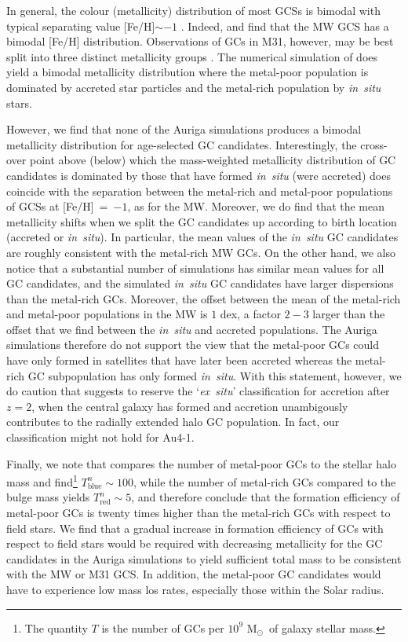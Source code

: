 \documentclass[a4paper,fleqn,usenatbib]{mnras}
\newcommand{\Sun}[0]{\ensuremath{_{\odot}}}
\begin{document}
In general, the colour (metallicity) distribution of most GCSs is bimodal 
with typical separating value [Fe/H]$\sim -1$ \citep{1985ApJ...293..424Z,
1999AJ....118.1526G,2001AJ....121.2974L,2006ApJ...639...95P}. Indeed, 
\citet{1998gcs..book.....A} and \citet{Harris2001} find that the MW GCS has a 
bimodal [Fe/H] distribution. Observations of GCs in M31, however, may be best 
split into three distinct metallicity groups \citep{2016ApJ...824...42C}. The 
numerical simulation of \citet{2017MNRAS.465.3622R} does yield a bimodal 
metallicity distribution where the metal-poor population is dominated by accreted 
star particles and the metal-rich population by {\it in~situ} stars. 

However, we find that none of the Auriga simulations produces a bimodal 
metallicity distribution for age-selected GC candidates. Interestingly, the 
cross-over point above (below) which the mass-weighted metallicity distribution
of GC candidates is dominated by those that have formed {\it in~situ} (were
accreted) does coincide with the separation between the metal-rich and metal-poor
populations of GCSs at [Fe/H]~=~$-1$, as for the MW. Moreover, we do find 
that the mean metallicity shifts when we split the GC candidates up according 
to birth location (accreted or {\it in~situ}). In particular, the mean values of 
the {\it in~situ} GC candidates are roughly consistent with the metal-rich MW GCs.
On the other hand, we also notice that a substantial number of simulations has similar 
mean values for all GC candidates, and the simulated {\it in~situ} GC candidates 
have larger dispersions than the metal-rich GCs. Moreover, the offset between 
the mean of the metal-rich and metal-poor populations in the MW is $1$ dex, a
factor $2-3$ larger than the offset that we find between the {\it in~situ} and 
accreted populations. The Auriga simulations therefore do not support the view 
that the metal-poor GCs could have only formed in satellites that have later been 
accreted whereas the metal-rich GC subpopulation has only formed {\it in~situ}. 
With this statement, however, we do caution that \citet{2019MNRAS.486.3134K} suggests 
to reserve the `{\it ex~situ}' classification for accretion after $z=2$, when
the central galaxy has formed and accretion unambigously contributes to the
radially extended halo GC population. In fact, our classification might not hold
for Au4-1.

Finally, we note that \citet{2006ARA&A..44..193B} compares the number of metal-poor 
GCs to the stellar halo mass and find\footnote{The quantity $T$ is the number of 
GCs per $10^9$ M\Sun \, of galaxy stellar mass.} $T^n_{\text{blue}} \sim 100$, 
while the number of metal-rich GCs compared to the bulge mass yields 
$T^n_{\text{red}} \sim 5$, and therefore conclude that the formation efficiency
of metal-poor GCs is twenty times higher than the metal-rich GCs with respect to 
field stars. We find that a gradual increase in formation efficiency of GCs
with respect to field stars would be required with decreasing metallicity for
the GC candidates in the Auriga simulations to yield sufficient total mass to
be consistent with the MW or M31 GCS. In addition, the metal-poor GC candidates
would have to experience low mass los rates, especially those within the Solar
radius.
\end{document}
